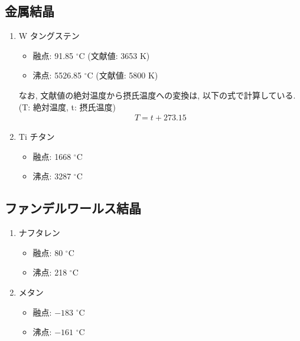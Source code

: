 \documentclass[dvipdfmx, a4paper]{jsarticle}
\begin{document}
\begin{twocolumn}
    \subsection{金属結晶}
      \begin{enumerate}
        \item W タングステン\cite{Wの特徴}
        \begin{itemize}
          \item 融点: 91.85 ${}^{\circ}$C (文献値: 3653 K)
          \item 沸点: 5526.85 ${}^{\circ}$C (文献値: 5800 K)
        \end{itemize}
        なお, 文献値の絶対温度から摂氏温度への変換は, 以下の式で計算している.\\(T: 絶対温度, t: 摂氏温度)\cite{温度}
        \begin{align*}
          T = t + 273.15
        \end{align*}
        \item Ti チタン\cite{Tiの特徴}
        \begin{itemize}
          \item 融点: 1668 ${}^{\circ}$C
          \item 沸点: 3287 ${}^{\circ}$C
        \end{itemize}
      \end{enumerate}
  \newpage
    \subsection{ファンデルワールス結晶}
      \begin{enumerate}
        \item {} ナフタレン\cite{ナフタレン}
        \begin{itemize}
          \item 融点: 80 ${}^{\circ}$C
          \item 沸点: 218 ${}^{\circ}$C
        \end{itemize}
        \item {} メタン\cite{メタン}
        \begin{itemize}
          \item 融点: $-183$ ${}^{\circ}$C
          \item 沸点: $-161$ ${}^{\circ}$C
        \end{itemize}
      \end{enumerate}

\end{twocolumn}
\end{document}
